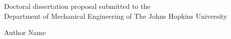 











\TitlePageSpacing \thispagestyle{empty}

\begin{center}
    Doctoral dissertation proposal submitted to the \\
    Department of Mechanical Engineering of The Johns Hopkins University
    
    \vspace{0.5in}                      %
    { \par}  
    
    \vspace{0.25in}                     %
    
    Author Name                         %
\end{center}



\vspace{0.75in}                         %

